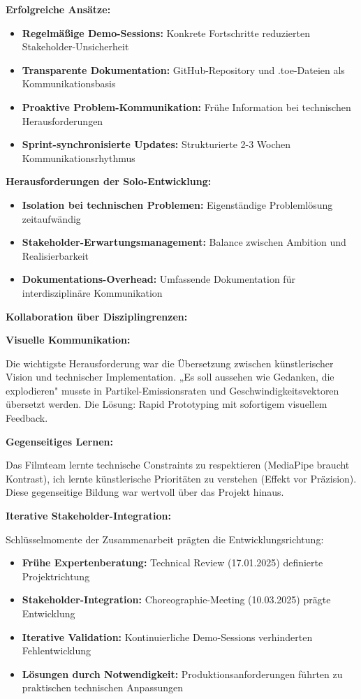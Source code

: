 \textbf{Erfolgreiche Ansätze:}
\begin{itemize}
\item \textbf{Regelmäßige Demo-Sessions:} Konkrete Fortschritte reduzierten Stakeholder-Unsicherheit
\item \textbf{Transparente Dokumentation:} GitHub-Repository und .toe-Dateien als Kommunikationsbasis
\item \textbf{Proaktive Problem-Kommunikation:} Frühe Information bei technischen Herausforderungen
\item \textbf{Sprint-synchronisierte Updates:} Strukturierte 2-3 Wochen Kommunikationsrhythmus
\end{itemize}

\textbf{Herausforderungen der Solo-Entwicklung:}
\begin{itemize}
\item \textbf{Isolation bei technischen Problemen:} Eigenständige Problemlösung zeitaufwändig
\item \textbf{Stakeholder-Erwartungsmanagement:} Balance zwischen Ambition und Realisierbarkeit
\item \textbf{Dokumentations-Overhead:} Umfassende Dokumentation für interdisziplinäre Kommunikation
\end{itemize}

\textbf{Kollaboration über Disziplingrenzen:}

\textbf{Visuelle Kommunikation:}

Die wichtigste Herausforderung war die Übersetzung zwischen künstlerischer Vision und technischer Implementation. „Es soll aussehen wie Gedanken, die explodieren" musste in Partikel-Emissionsraten und Geschwindigkeitsvektoren übersetzt werden. Die Lösung: Rapid Prototyping mit sofortigem visuellem Feedback.

\textbf{Gegenseitiges Lernen:}

Das Filmteam lernte technische Constraints zu respektieren (MediaPipe braucht Kontrast), ich lernte künstlerische Prioritäten zu verstehen (Effekt vor Präzision). Diese gegenseitige Bildung war wertvoll über das Projekt hinaus.

\textbf{Iterative Stakeholder-Integration:}

Schlüsselmomente der Zusammenarbeit prägten die Entwicklungsrichtung:
\begin{itemize}
\item \textbf{Frühe Expertenberatung:} Technical Review (17.01.2025) definierte Projektrichtung
\item \textbf{Stakeholder-Integration:} Choreographie-Meeting (10.03.2025) prägte Entwicklung
\item \textbf{Iterative Validation:} Kontinuierliche Demo-Sessions verhinderten Fehlentwicklung
\item \textbf{Lösungen durch Notwendigkeit:} Produktionsanforderungen führten zu praktischen technischen Anpassungen
\end{itemize}

